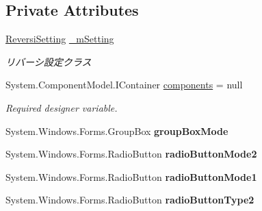 \subsection*{Private Attributes}
\begin{DoxyCompactItemize}
\item 
\mbox{\label{class_reversi4color_form_1_1_setting_form_ab95f34635d540ab268e1c3febf4be160}} 
\hyperlink{class_reversi4color_form_1_1_reversi_setting}{Reversi\+Setting} \hyperlink{class_reversi4color_form_1_1_setting_form_ab95f34635d540ab268e1c3febf4be160}{\+\_\+m\+Setting}
\begin{DoxyCompactList}\small\item\em リバーシ設定クラス \end{DoxyCompactList}\item 
System.\+Component\+Model.\+I\+Container \hyperlink{class_reversi4color_form_1_1_setting_form_aff2698ca8c13967f78ffa2db8be83d50}{components} = null
\begin{DoxyCompactList}\small\item\em Required designer variable. \end{DoxyCompactList}\item 
\mbox{\label{class_reversi4color_form_1_1_setting_form_a0efa5cd5e08d4f28cf280abd9e817f17}} 
System.\+Windows.\+Forms.\+Group\+Box {\bfseries group\+Box\+Mode}
\item 
\mbox{\label{class_reversi4color_form_1_1_setting_form_a372e4ef976497e4fa458aecab8959170}} 
System.\+Windows.\+Forms.\+Radio\+Button {\bfseries radio\+Button\+Mode2}
\item 
\mbox{\label{class_reversi4color_form_1_1_setting_form_a521063297cf26245637f636038e5e556}} 
System.\+Windows.\+Forms.\+Radio\+Button {\bfseries radio\+Button\+Mode1}
\item 
\mbox{\label{class_reversi4color_form_1_1_setting_form_a8f838de781a551ec1b2b4faf17bf3165}} 
System.\+Windows.\+Forms.\+Radio\+Button {\bfseries radio\+Button\+Type2}
\item 
\mbox{\label{class_reversi4color_form_1_1_setting_form_ad8861b62d042fd1454caf801a73fb9c8}} 

\end{DoxyCompactItemize}
